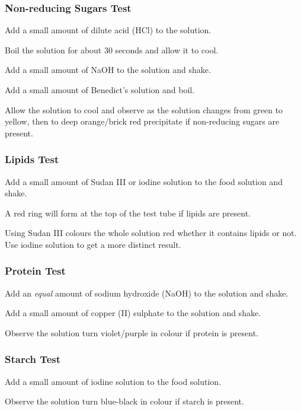 \subsubsection{Non-reducing Sugars Test}
\begin{itemize*}
\item Add a small amount of dilute acid (HCl) to the solution. 
\item Boil the solution for about 30 seconds and allow it to cool. 
\item Add a small amount of NaOH to the solution and shake.
\item Add a small amount of Benedict's solution and boil. 
\item Allow the solution to cool and observe as the solution changes from green to yellow, then to deep orange\slash brick red precipitate if non-reducing sugars are present.
\end{itemize*}

\subsubsection{Lipids Test}
\begin{itemize*}
\item Add a small amount of Sudan III or iodine solution to the food solution and shake. 
\item A red ring will form at the top of the test tube if lipids are present.
\end{itemize*}
Using Sudan III colours the whole solution red whether it contains lipids or not. Use iodine solution to get a more distinct result.

\subsubsection{Protein Test}
\begin{itemize*}
\item Add an \emph{equal} amount of sodium hydroxide (NaOH) to the solution and shake. 
\item Add a small amount of copper (II) sulphate to the solution and shake.
\item Observe the solution turn violet\slash purple in colour if protein is present.
\end{itemize*}

\subsubsection{Starch Test}
\begin{itemize*}
\item Add a small amount of iodine solution to the food solution.
\item Observe the solution turn blue-black in colour if starch is present.
\end{itemize*}


